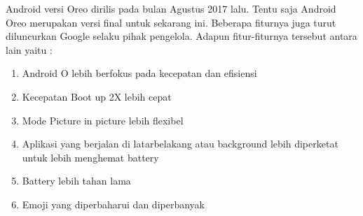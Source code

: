 \begin{enumerate}
Android versi Oreo dirilis pada bulan Agustus 2017 lalu. Tentu saja Android Oreo merupakan versi final untuk sekarang ini. Beberapa fiturnya juga turut diluncurkan Google selaku pihak pengelola. Adapun fitur-fiturnya tersebut antara lain yaitu :
\begin{enumerate}
    \item Android O lebih berfokus pada kecepatan dan efisiensi
    \item Kecepatan Boot up 2X lebih cepat
    \item Mode Picture in picture lebih flexibel
    \item Aplikasi yang berjalan di latarbelakang atau background lebih diperketat untuk lebih menghemat battery
    \item Battery lebih tahan lama
    \item Emoji yang diperbaharui dan diperbanyak
\end{enumerate}
\end{enumerate}
